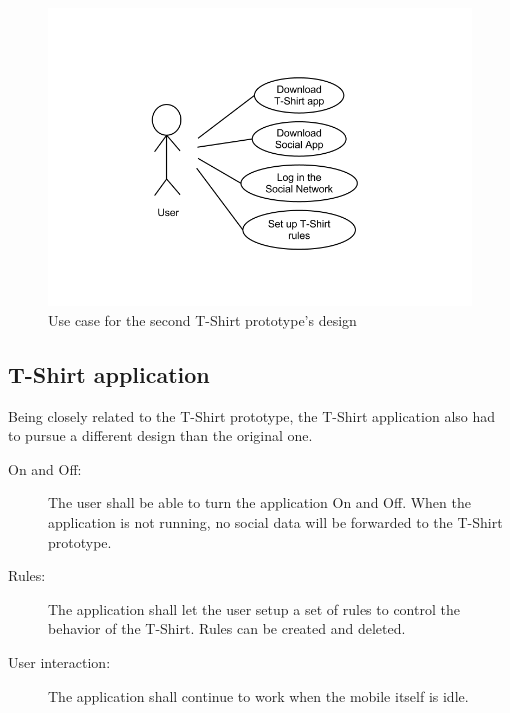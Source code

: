 	\begin{figure}[h!]
	\centering \includegraphics[scale=0.50]{img/req-usecase2.png}
	\caption{Use case for the second T-Shirt prototype's design}
	\label{fig:req-usecase2}
	\end{figure}

	\newpage

	\subsection{T-Shirt application}

	Being closely related to the T-Shirt prototype, the T-Shirt application
	also had to pursue a different design than the original one.
	
	\begin{description}
		\item[On and Off:] The user shall be able to turn the application On and Off.
		When the application is not running, no social data will be forwarded
		to the T-Shirt prototype.
		\item[Rules:] The application shall let the user setup a set of rules
		to control the behavior of the T-Shirt. Rules can be created and deleted.
		\item[User interaction:] The application shall continue to work
		when the mobile itself is idle.
	\end{description}

